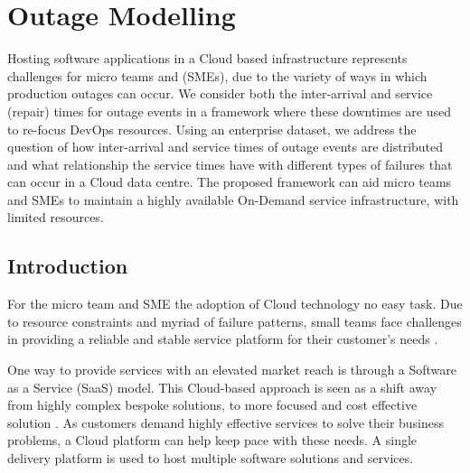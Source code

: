 
\chapter{Outage Modelling} %
\label{ch:OM}

\begin{textsl}
{\small Hosting software applications in a Cloud based infrastructure represents challenges for micro teams and (SMEs), due to the variety of ways in which production outages can occur. We consider both the inter-arrival and service (repair) times for outage events in a framework where these downtimes are used to re-focus DevOps resources. Using an enterprise dataset, we address the question of how inter-arrival and service times of outage events are distributed and what relationship the service times have with different types of failures that can occur in a Cloud data centre. The proposed framework can aid micro teams and SMEs to maintain a highly available On-Demand service infrastructure, with limited resources.}
\end{textsl}

\vspace*{1cm}




\section{Introduction}
For the micro team and SME the adoption of Cloud technology no easy task. Due to resource constraints and myriad of failure patterns, small teams face challenges in providing a reliable and stable service platform for their customer's needs \cite{carcary2014adoption}. 

One way to provide services with an elevated market reach is through a Software as a Service (SaaS) model. This Cloud-based approach is seen as a shift away from highly complex bespoke solutions, to more focused and cost effective solution \cite{Cloudbook2015}. As customers demand highly effective services to solve their business problems, a Cloud platform can help keep pace with these needs. A single delivery platform is used to host multiple software solutions and services. \par

